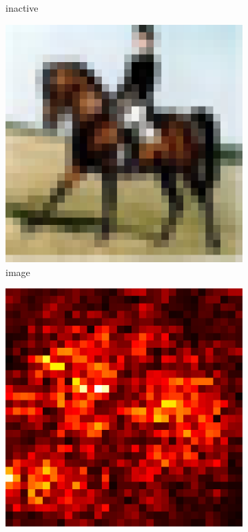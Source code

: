 \documentclass[preprint,12pt]{elsarticle}
\begin{document}
\begin{figure}
\begin{subfigure}{0.14\textwidth}
        \caption{inactive}
    \end{subfigure}
    \hfill
    \begin{subfigure}{0.14\linewidth}
        \centering
        \includegraphics[width=\linewidth]{../visualizations/examples/cifar10/cnn/images/7.png}
        \caption{image}
    \end{subfigure}
    \hfill
    \begin{subfigure}{0.14\linewidth}
        \centering
        \includegraphics[width=\linewidth]{../visualizations/examples/cifar10/cnn/saliency_map/7.png}

\end{subfigure}
\end{figure}
\end{document}
